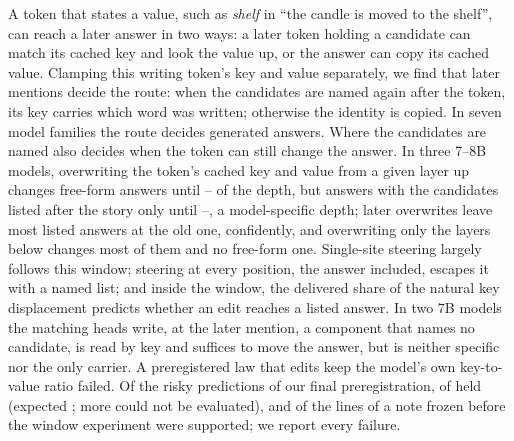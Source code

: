 A token that states a value, such as \emph{shelf} in ``the candle is moved to the shelf'', can reach a later answer in two ways: a later token holding a candidate can match its cached key and look the value up, or the answer can copy its cached value. Clamping this writing token's key and value separately, we find that later mentions decide the route: when the candidates are named again after the token, its key carries which word was written; otherwise the identity is copied. In seven model families the route decides generated answers. Where the candidates are named also decides when the token can still change the answer. In three 7--8B models, overwriting the token's cached key and value from a given layer up changes free-form answers until \pctn{\NqLcFracNoneMin}--\pct{\NqLcFracNoneMax} of the depth, but answers with the candidates listed after the story only until \pctn{\NqLcFracListedMin}--\pct{\NqLcFracListedMax}, a model-specific depth; later overwrites leave most listed answers at the old one, confidently, and overwriting only the layers below changes most of them and no free-form one. Single-site steering largely follows this window; steering at every position, the answer included, escapes it with a named list; and inside the window, the delivered share of the natural key displacement predicts whether an edit reaches a listed answer. In two 7B models the matching heads write, at the later mention, a component that names no candidate, is read by key and suffices to move the answer, but is neither specific nor the only carrier. A preregistered law that edits keep the model's own key-to-value ratio failed. Of the risky predictions of our final preregistration, \JxRiskyMetABCD{} of \JxRiskyVerdABCD{} held (expected \JxRiskyExpABCD; \JxRiskyNotEvalABCD{} more could not be evaluated), and \NqTotSupported{} of the \NqTotLines{} lines of a note frozen before the window experiment were supported; we report every failure.
